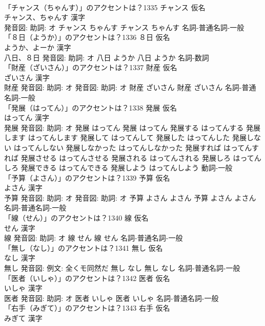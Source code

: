 \documentclass[8pt]{extreport}
\begin{document}
\begin{CJK}{UTF8}{min}
\\	「チャンス（ちゃんす）」のアクセントは？1335	チャンス 仮名　
\\	チャンス、ちゃんす 漢字　
\\	発音図: 助詞: オ	チャンス ちゃんす		チャンス ちゃんす				名詞-普通名詞-一般 
\\	「８日（ようか）」のアクセントは？1336	８日 仮名　
\\	ようか、よーか 漢字　
\\	八日、８日 発音図: 助詞: オ	八日 ようか		八日 ようか				名詞-数詞 
\\	「財産（ざいさん）」のアクセントは？1337	財産 仮名　
\\	ざいさん 漢字　
\\	財産 発音図: 助詞: オ 発音図: 助詞: オ	財産 ざいさん		財産 ざいさん				名詞-普通名詞-一般 
\\	「発展（はってん）」のアクセントは？1338	発展 仮名　
\\	はってん 漢字　
\\	発展 発音図: 助詞: オ	発展 はってん		発展 はってん 発展する はってんする 発展します はってんします 発展して はってんして 発展した はってんした 発展しない はってんしない 発展しなかった はってんしなかった 発展すれば はってんすれば 発展させる はってんさせる 発展される はってんされる 発展しろ はってんしろ 発展できる はってんできる 発展しよう はってんしよう				動詞-一般 
\\	「予算（よさん）」のアクセントは？1339	予算 仮名　
\\	よさん 漢字　
\\	予算 発音図: 助詞: オ 発音図: 助詞: オ	予算 よさん よさん		予算 よさん よさん				名詞-普通名詞-一般 
\\	「線（せん）」のアクセントは？1340	線 仮名　
\\	せん 漢字　
\\	線 発音図: 助詞: オ	線 せん		線 せん				名詞-普通名詞-一般 
\\	「無し（なし）」のアクセントは？1341	無し 仮名　
\\	なし 漢字　
\\	無し 発音図: 例文: 全くモ同然だ	無し なし		無し なし				名詞-普通名詞-一般 
\\	「医者（いしゃ）」のアクセントは？1342	医者 仮名　
\\	いしゃ 漢字　
\\	医者 発音図: 助詞: オ	医者 いしゃ		医者 いしゃ				名詞-普通名詞-一般 
\\	「右手（みぎて）」のアクセントは？1343	右手 仮名　
\\	みぎて 漢字　

\end{CJK}
\end{document}

